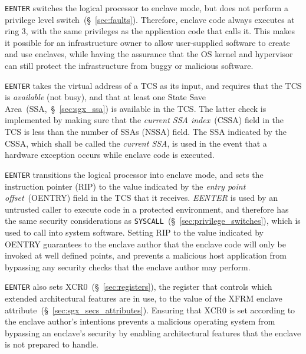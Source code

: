 \texttt{EENTER} switches the logical processor to enclave mode, but does not
perform a privilege level switch~(\S~\ref{sec:faults}). Therefore, enclave code
always executes at ring 3, with the same privileges as the application code
that calls it. This makes it possible for an infrastructure owner to allow
user-supplied software to create and use enclaves, while having the assurance
that the OS kernel and hypervisor can still protect the infrastructure from
buggy or malicious software.


\texttt{EENTER} takes the virtual address of a TCS as its input, and requires
that the TCS is \textit{available} (not busy), and that at least one State Save
Area~(SSA,~\S~\ref{sec:sgx_ssa}) is available in the TCS. The latter check is
implemented by making sure that the \textit{current SSA index}~(CSSA) field in
the TCS is less than the number of SSAs (NSSA) field. The SSA indicated by the
CSSA, which shall be called the \textit{current SSA}, is used in the event that
a hardware exception occurs while enclave code is executed.

\texttt{EENTER} transitions the logical processor into enclave mode, and sets
the instruction pointer (RIP) to the value indicated by the \textit{entry point
offset}~(OENTRY) field in the TCS that it receives. \textit{EENTER} is used by
an untrusted caller to execute code in a protected environment, and therefore
has the same security considerations as
\texttt{SYSCALL}~(\S~\ref{sec:privilege_switches}), which is used to call into
system software. Setting RIP to the value indicated by OENTRY guarantees to the
enclave author that the enclave code will only be invoked at well defined
points, and prevents a malicious host application from bypassing any security
checks that the enclave author may perform.


\texttt{EENTER} also sets XCR0~(\S~\ref{sec:registers}), the register that
controls which extended architectural features are in use, to the value of the
XFRM enclave attribute~(\S~\ref{sec:sgx_secs_attributes}). Ensuring that XCR0 is
set according to the enclave author's intentions prevents a malicious operating
system from bypassing an enclave's security by enabling architectural features
that the enclave is not prepared to handle.


